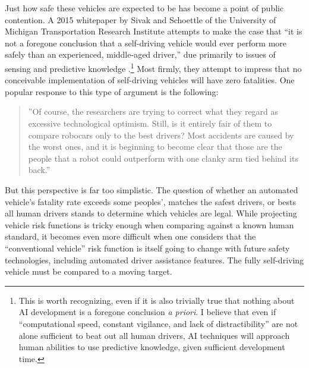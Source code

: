 Just how safe these vehicles are expected to be has become a point of
public contention. A 2015 whitepaper by Sivak and Schoettle of the
University of Michigan Transportation Research Institute attempts to
make the case that ``it is not a foregone conclusion that a
self-driving vehicle would ever perform more safely than an
experienced, middle-aged driver,'' due primarily to issues of sensing and
predictive knowledge \cite[p. i]{???-SivakSchoettle}.\footnote{This is worth
recognizing, even if it is also trivially true that nothing about AI
development is a foregone conclusion \emph{a priori}. I believe that
even if ``computational speed, constant vigilance, and lack of
distractibility'' are not alone sufficient to beat out all human
drivers,\cite[p. 4]{???-SivakSchoettle} AI techniques will approach human abilities to use predictive
knowledge, given sufficient development time.} Most firmly, they
attempt to impress that no conceivable implementation of self-driving
vehicles will have zero fatalities. One popular response to this type of
argument is the following: 
\begin{quote}''Of course, the researchers are trying to correct what they regard as
excessive technological optimism. Still, is it entirely fair of them
to compare robocars only to the best drivers? Most accidents are
caused by the worst ones, and it is beginning to become clear that
those are the people that a robot could outperform with one clanky
arm tied behind its back.''\cite{???-RossSafety}\end{quote} 
But this perspective is far too simplistic. The question of whether an
automated vehicle's fatality rate exceeds some peoples', matches the
safest drivers, or bests all human drivers stands to determine which
vehicles are legal.\cite[p. 6]{???-SivakSchoettle} While projecting vehicle
risk functions is tricky enough when comparing against a known human
standard, it becomes even more difficult when one considers that the
``conventional vehicle'' risk function is itself going to change with
future safety technologies, including automated driver assistance
features. The fully self-driving vehicle must be compared to a moving target.


